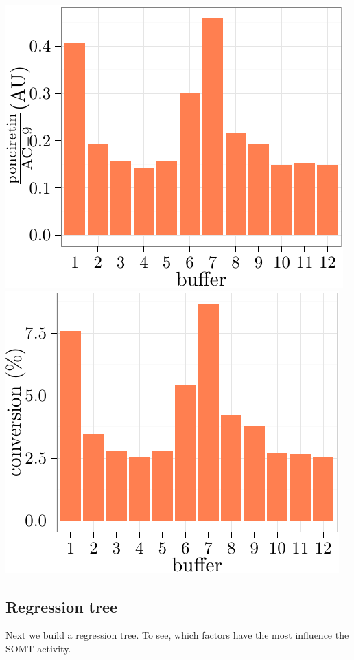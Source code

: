 \documentclass[]{article}
\begin{document}
\includegraphics{analysis_files/figure-latex/unnamed-chunk-7-1.pdf}
\includegraphics{analysis_files/figure-latex/unnamed-chunk-7-2.pdf}

\subsection{Regression tree}\label{regression-tree-1}

Next we build a regression tree. To see, which factors have the most
influence the SOMT activity.
\end{document}
